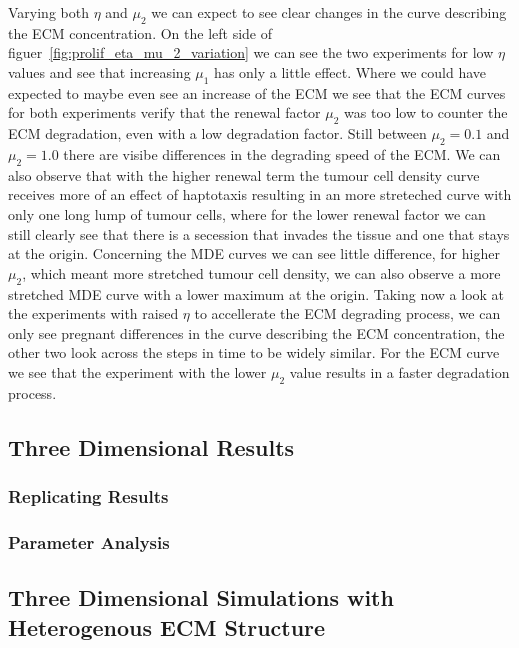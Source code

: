 Varying both $\eta$ and $\mu_2$ we can expect to see clear changes in the curve describing the ECM concentration. On the left side of figuer~\ref{fig:prolif_eta_mu_2_variation} we can see the two experiments for low $\eta$ values and see that increasing $\mu_1$ has only a little effect. Where we could have expected to maybe even see an increase of the ECM we see that the ECM curves for both experiments verify that the renewal factor $\mu_2$ was too low to counter the ECM degradation, even with a low degradation factor. Still between $\mu_2=0.1$ and $\mu_2=1.0$ there are visibe differences in the degrading speed of the ECM. We can also observe that with the higher renewal term the tumour cell density curve receives more of an effect of haptotaxis resulting in an more streteched curve with only one long lump of tumour cells, where for the lower renewal factor we can still clearly see that there is a secession that invades the tissue and one that stays at the origin. Concerning the MDE curves we can see little difference, for higher $\mu_2$, which meant more stretched tumour cell density, we can also observe a more stretched MDE curve with a lower maximum at the origin. \newline 
Taking now a look at the experiments with raised $\eta$ to accellerate the ECM degrading process, we can only see pregnant differences in the curve describing the ECM concentration, the other two look across the steps in time to be widely similar. For the ECM curve we see that the experiment with the lower $\mu_2$ value results in a faster degradation process.




\subsection{Three Dimensional Results}
\subsubsection{Replicating Results}
\subsubsection{Parameter Analysis}
\subsection{Three Dimensional Simulations with Heterogenous ECM Structure}
